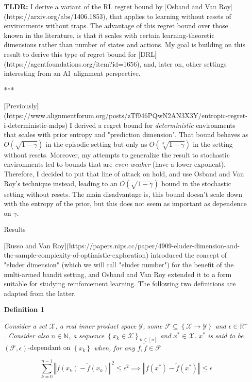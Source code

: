 \documentclass[a4paper]{article}
\newcommand{\Co}[1]{}
\newcommand{\AP}[1]{\left(#1\right)}
\newcommand{\AC}[1]{\left\{#1\right\}}
\newcommand{\Nats}{\mathbb{N}}
\newcommand{\Reals}{\mathbb{R}}
\newcommand{\Norm}[1]{\left\Vert #1 \right\Vert}
\newcommand{\X}{\mathcal{X}}
\newcommand{\Y}{\mathcal{Y}}
\newcommand{\F}{\mathcal{F}}
\begin{document}
\textbf{TLDR:}\Co{b} I derive a variant of the RL regret bound by [Osband and Van Roy](https://arxiv.org/abs/1406.1853), that applies to learning without resets of environments without traps. The advantage of this regret bound over those known in the literature, is that it scales with certain learning-theoretic dimensions rather than number of states and actions. My goal is building on this result to derive this type of regret bound for [DRL](https://agentfoundations.org/item?id=1656), and, later on, other settings interesting from an AI\ alignment perspective.

***

[Previously](https://www.alignmentforum.org/posts/zTf946PQwN2AN3X3Y/entropic-regret-i-deterministic-mdps) I derived a regret bound for \textit{deterministic}\Co{i} environments that scales with prior entropy and "prediction dimension". That bound behaves as $O\AP{\sqrt{1-\gamma}}$ in the episodic setting but only as $O\AP{\sqrt[3]{1-\gamma}}$ in the setting without resets. Moreover, my attempts to generalize the result to stochastic environments led to bounds that are \textit{even weaker}\Co{i} (have a lower exponent). Therefore, I decided to put that line of attack on hold, and use Osband and Van Roy's technique instead, leading to an $O\AP{\sqrt{1-\gamma}}$ bound in the stochastic setting without resets. The main disadvantage is, this bound doesn't scale down with the entropy of the prior, but this does not seem as important as dependence on $\gamma$.

\begin{Huge}Results\end{Huge}

[Russo and Van Roy](https://papers.nips.cc/paper/4909-eluder-dimension-and-the-sample-complexity-of-optimistic-exploration) introduced the concept of "eluder dimension" (which we will call "eluder number") for the benefit of the multi-armed bandit setting, and Osband and Van Roy extended it to a form suitable for studying reinforcement learning. The following two definitions are adapted from the latter.

\textbf{Definition 1}\Co{b}

\textit{Consider a set $\X$, a real inner product space $\Y$, some $\F\subseteq\AC{\X\rightarrow\Y}$ and $\epsilon\in\Reals^+$. Consider also $n\in\Nats$, a sequence $\AC{x_k\in\X}_{k\in[n]}$ and $x^*\in\X$. $x^*$ is said to be} $\AP{\F,\epsilon}$-dependant on $\AC{x_k}$ \textit{when, for any $f,\tilde{f}\in\F$}\Co{i}

$$\sum_{k=0}^{n-1}\Norm{f\AP{x_k}-\tilde{f}\AP{x_k}}^2 \leq \epsilon^2 \implies \Norm{f\AP{x^*}-\tilde{f}\AP{x^*}}\leq\epsilon$$
\end{document}
